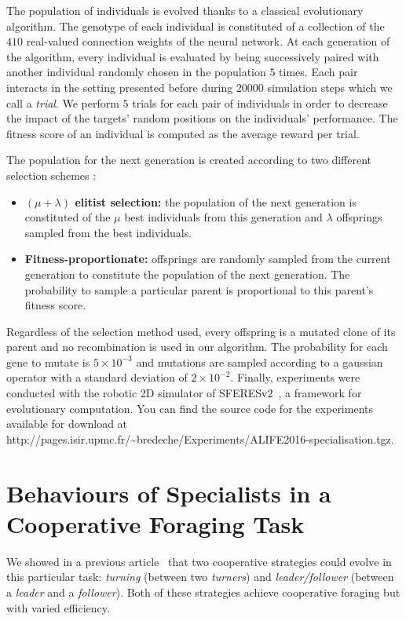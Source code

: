   The population of individuals is evolved thanks to a classical evolutionary algorithm. The genotype of each individual is constituted of a collection of the $410$ real-valued connection weights of the neural network. At each generation of the algorithm, every individual is evaluated by being successively paired with another individual randomly chosen in the population $5$ times. Each pair interacts in the setting presented before during $20000$ simulation steps which we call a \emph{trial}. We perform $5$ trials for each pair of individuals in order to decrease the impact of the targets' random positions on the individuals' performance. The fitness score of an individual is computed as the average reward per trial.

  The population for the next generation is created according to two different selection schemes :

  \begin{itemize}
    \item{\textbf{\((\mu + \lambda)\) elitist selection:} the population of the next generation is constituted of the $\mu$ best individuals from this generation and $\lambda$ offsprings sampled from the best individuals.}
    \item{\textbf{Fitness-proportionate:} offsprings are randomly sampled from the current generation to constitute the population of the next generation. The probability to sample a particular parent is proportional to this parent's fitness score.}
  \end{itemize}

  Regardless of the selection method used, every offspring is a mutated clone of its parent and no recombination is used in our algorithm. The probability for each gene to mutate is \(5 \times 10^{-3}\) and mutations are sampled according to a gaussian operator with a standard deviation of \(2 \times 10^{-2}\). Finally, experiments were conducted with the robotic 2D simulator of SFERESv2~\parencite{Mouret2010}, a framework for evolutionary computation. You can find the source code for the experiments available for download at http://pages.isir.upmc.fr/\textasciitilde bredeche/Experiments/ALIFE2016-specialisation.tgz.
    

\section{Behaviours of Specialists in a Cooperative Foraging Task}
\label{sec:efficiency}
  We showed in a previous article~\parencite{Bernard2015} that two cooperative strategies could evolve in this particular task: \emph{turning} (between two \emph{turners}) and \emph{leader/follower} (between a \emph{leader} and a \emph{follower}). Both of these strategies achieve cooperative foraging but with varied efficiency.

